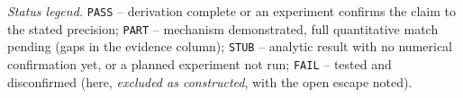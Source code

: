 %
%
%

\noindent\textit{Status legend.}
\texttt{PASS} -- derivation complete or an experiment confirms the claim to the stated
precision; \texttt{PART} -- mechanism demonstrated, full quantitative match pending (gaps
in the evidence column); \texttt{STUB} -- analytic result with no numerical confirmation
yet, or a planned experiment not run; \texttt{FAIL} -- tested and disconfirmed (here,
\emph{excluded as constructed}, with the open escape noted).

